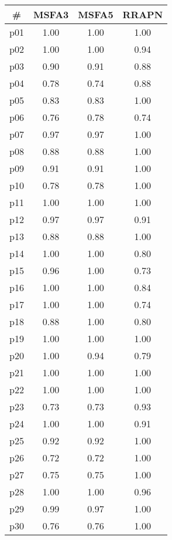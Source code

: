 \begin{tabular}{cccc}
\toprule
\textbf{\#} & \textbf{MSFA3} & \textbf{MSFA5} & \textbf{RRAPN}\\
\midrule
p01 & 1.00 & 1.00 & 1.00\\
p02 & 1.00 & 1.00 & 0.94\\
p03 & 0.90 & 0.91 & 0.88\\
p04 & 0.78 & 0.74 & 0.88\\
p05 & 0.83 & 0.83 & 1.00\\
p06 & 0.76 & 0.78 & 0.74\\
p07 & 0.97 & 0.97 & 1.00\\
p08 & 0.88 & 0.88 & 1.00\\
p09 & 0.91 & 0.91 & 1.00\\
p10 & 0.78 & 0.78 & 1.00\\
p11 & 1.00 & 1.00 & 1.00\\
p12 & 0.97 & 0.97 & 0.91\\
p13 & 0.88 & 0.88 & 1.00\\
p14 & 1.00 & 1.00 & 0.80\\
p15 & 0.96 & 1.00 & 0.73\\
p16 & 1.00 & 1.00 & 0.84\\
p17 & 1.00 & 1.00 & 0.74\\
p18 & 0.88 & 1.00 & 0.80\\
p19 & 1.00 & 1.00 & 1.00\\
p20 & 1.00 & 0.94 & 0.79\\
p21 & 1.00 & 1.00 & 1.00\\
p22 & 1.00 & 1.00 & 1.00\\
p23 & 0.73 & 0.73 & 0.93\\
p24 & 1.00 & 1.00 & 0.91\\
p25 & 0.92 & 0.92 & 1.00\\
p26 & 0.72 & 0.72 & 1.00\\
p27 & 0.75 & 0.75 & 1.00\\
p28 & 1.00 & 1.00 & 0.96\\
p29 & 0.99 & 0.97 & 1.00\\
p30 & 0.76 & 0.76 & 1.00\\
\bottomrule
\end{tabular}

